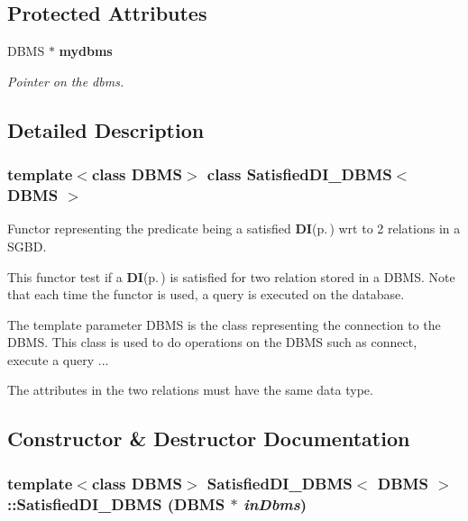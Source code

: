 \subsection*{Protected Attributes}
\begin{CompactItemize}
\item 
DBMS $\ast$ {\bf mydbms}\label{class_satisfied_d_i___d_b_m_s_6660a79501bda274241e9de5b532f0fb}

\begin{CompactList}\small\item\em Pointer on the dbms. \item\end{CompactList}\end{CompactItemize}


\subsection{Detailed Description}
\subsubsection*{template$<$class DBMS$>$ class Satisfied\-DI\_\-DBMS$<$ DBMS $>$}

Functor representing the predicate being a satisfied {\bf DI}{\rm (p.\,\pageref{class_d_i})} wrt to 2 relations in a SGBD. 

This functor test if a {\bf DI}{\rm (p.\,\pageref{class_d_i})} is satisfied for two relation stored in a DBMS. Note that each time the functor is used, a query is executed on the database.

The template parameter DBMS is the class representing the connection to the DBMS. This class is used to do operations on the DBMS such as connect, execute a query ...

The attributes in the two relations must have the same data type. 



\subsection{Constructor \& Destructor Documentation}
\subsubsection{\setlength{\rightskip}{0pt plus 5cm}template$<$class DBMS$>$ {\bf Satisfied\-DI\_\-DBMS}$<$ DBMS $>$::{\bf Satisfied\-DI\_\-DBMS} (DBMS $\ast$ {\em in\-Dbms})\hspace{0.3cm}{\tt  [inline]}}\label{class_satisfied_d_i___d_b_m_s_ad1e8861902cab7d6a4131623d7f0ced}


